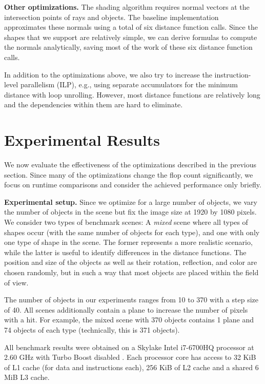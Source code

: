 \documentclass[letterpaper]{article}
\newcommand{\mypar}[1]{{\bf #1.}}
\begin{document}
\mypar{Other optimizations}
The shading algorithm requires normal vectors at the intersection points of rays and objects. The baseline implementation approximates these normals using a total of six distance function calls.
Since the shapes that we support are relatively simple, we can derive formulas to compute the normals analytically, saving most of the work of these six distance function calls.

In addition to the optimizations above, we also try to increase the instruction-level parallelism (ILP), e.g., using separate accumulators for the minimum distance with loop unrolling. However, most distance functions are relatively long and the dependencies within them are hard to eliminate.


\section{Experimental Results}\label{sec:exp}
We now evaluate the effectiveness of the optimizations described in the previous section. Since many of the optimizations change the flop count significantly, we focus on runtime comparisons and consider the achieved performance only briefly.

\mypar{Experimental setup}
Since we optimize for a large number of objects, we vary the number of objects in the scene but fix the image size at 1920 by 1080 pixels.
We consider two types of benchmark scenes: A \emph{mixed} scene where all types of shapes occur (with the same number of objects for each type), and one with only one type of shape in the scene. The former represents a more realistic scenario, while the latter is useful to identify differences in the distance functions.
The position and size of the objects as well as their rotation, reflection, and color are chosen randomly, but in such a way that most objects are placed within the field of view.

The number of objects in our experiments ranges from 10 to 370 with a step size of 40.
All scenes additionally contain a plane to increase the number of pixels with a hit.
For example, the mixed scene with 370 objects contains 1 plane and 74 objects of each type (technically, this is 371 objects).

All benchmark results were obtained on a Skylake Intel i7-6700HQ processor at 2.60 GHz with Turbo Boost disabled \cite{intel:ark}.
Each processor core has access to 32 KiB of L1 cache (for data and instructions each), 256 KiB of L2 cache and a shared 6 MiB L3 cache. 
\end{document}
